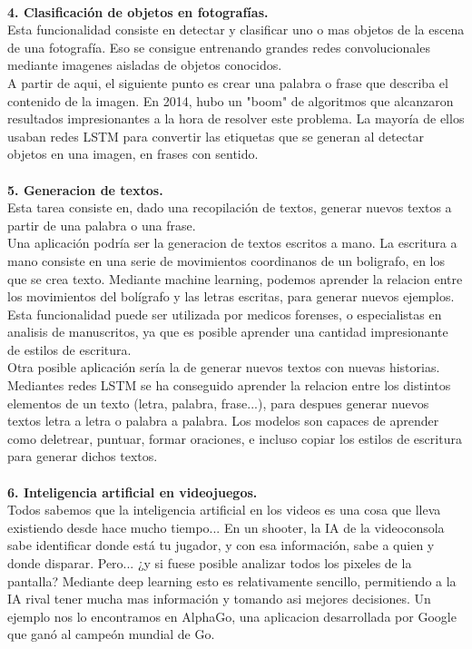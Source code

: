 \\\textbf{4. Clasificación de objetos en fotografías.}\\
Esta funcionalidad consiste en detectar y clasificar uno o mas objetos de la escena de una fotografía. Eso se consigue entrenando grandes redes convolucionales mediante imagenes aisladas de objetos conocidos.\\
A partir de aqui, el siguiente punto es crear una palabra o frase que describa el contenido de la imagen. En 2014, hubo un "boom" de algoritmos que alcanzaron resultados impresionantes a la hora de resolver este problema. La mayoría de ellos usaban redes LSTM para convertir las etiquetas que se generan al detectar objetos en una imagen, en frases con sentido.\\
\\\textbf{5. Generacion de textos.}\\
Esta tarea consiste en, dado una recopilación de textos, generar nuevos textos a partir de una palabra o una frase.\\
Una aplicación podría ser la generacion de textos escritos a mano. La escritura a mano consiste en una serie de movimientos coordinanos de un boligrafo, en los que se crea texto. Mediante machine learning, podemos aprender la relacion entre los movimientos del bolígrafo y las letras escritas, para generar nuevos ejemplos. Esta funcionalidad puede ser utilizada por medicos forenses, o especialistas en analisis de manuscritos, ya que es posible aprender una cantidad impresionante de estilos de escritura.\\
Otra posible aplicación sería la de generar nuevos textos con nuevas historias. Mediantes redes LSTM se ha conseguido aprender la relacion entre los distintos elementos de un texto (letra, palabra, frase...), para despues generar nuevos textos letra a letra o palabra a palabra. Los modelos son capaces de aprender como deletrear, puntuar, formar oraciones, e incluso copiar los estilos de escritura para generar dichos textos.\\
\\\textbf{6. Inteligencia artificial en videojuegos.}\\
Todos sabemos que la inteligencia artificial en los videos es una cosa que lleva existiendo desde hace mucho tiempo... En un shooter, la IA de la videoconsola sabe identificar donde está tu jugador, y con esa información, sabe a quien y donde disparar. Pero... ¿y si fuese posible analizar todos los pixeles de la pantalla? Mediante deep learning esto es relativamente sencillo, permitiendo a la IA rival tener mucha mas información y tomando asi mejores decisiones. Un ejemplo nos lo encontramos en AlphaGo, una aplicacion desarrollada por Google que ganó al campeón mundial de Go.\\\\
